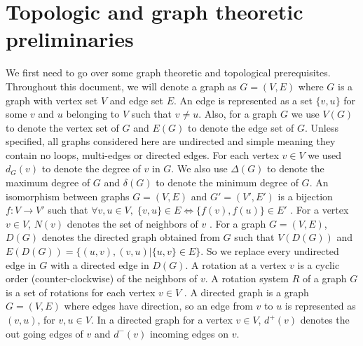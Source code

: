 \documentclass{article}
\begin{document}
   

\section{Topologic and graph theoretic preliminaries}\label{sec: prelim}
    We first need to go over some graph theoretic and topological prerequisites.
    Throughout this document, we will denote a graph as $G = (V, E)$ where $G$ is a graph with vertex set $V$ and edge set $E$. An edge is represented as a set $\{v, u\}$ for some $v$ and $u$ belonging to $V$ such that $v \neq u$. Also, for a graph $G$ we use $V(G)$ to denote the vertex set of $G$ and $E(G)$ to denote the edge set of $G$. 
    Unless specified, all graphs considered here are undirected and simple meaning they contain no loops, multi-edges or directed edges. 
    For each vertex $v\in V$ we used $d_G(v)$ to denote the degree of $v$ in $G$. We also use $\Delta(G)$ to denote the maximum degree of $G$ and $\delta(G)$ to denote the minimum degree of $G$. 
    An isomorphism between graphs $G = (V, E)$ and $G' = (V', E')$ is a bijection $f : V \to V'$ such that $\forall v, u \in V,\; \{v, u\} \in E \iff  \{f(v), f(u)\} \in E'$ \cite{Diestel97, West01}. For a vertex $v \in V$, $N(v)$ denotes the set of neighbors of $v$ \cite{Diestel97}. 
    For a graph $G = (V, E)$, $D(G)$ denotes the directed graph obtained from $G$ such that $V(D(G))$ and $E(D(G)) = \{(u,v), (v,u)|\{u,v\} \in E\}$. So we replace every undirected edge in $G$ with a directed edge in $D(G)$.
    A rotation at a vertex $v$ is a cyclic order (counter-clockwise) of the neighbors of $v$. A rotation system $R$ of a graph $G$ is a set of rotations for each vertex $v \in V$ \cite{Beyer16}.
    A directed graph is a graph $G  = (V, E)$ where edges have direction, so an edge from $v$ to $u$ is represented as $(v, u)$, for $v,u \in V$. In a directed graph for a vertex $v \in V$, $d^+(v)$ denotes the out going edges of $v$ and $d^-(v)$ incoming edges on $v$.
\end{document}
